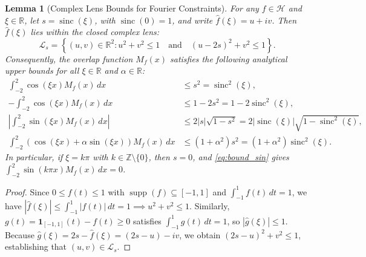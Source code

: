 \documentclass[11pt,a4paper]{article}
\newtheorem{lemma}[theorem]{Lemma}
\theoremstyle{definition}
\theoremstyle{remark}
\newcommand{\R}{\mathbb{R}}
\newcommand{\Z}{\mathbb{Z}}
\newcommand{\supp}{\operatorname{supp}}
\begin{document}
\begin{enumerate}
\begin{lemma}[Complex Lens Bounds for Fourier Constraints]
  \label{lem:lens}
  For any $f \in \mathcal{H}$ and $\xi \in \R$, let $s = \operatorname{sinc}(\xi)$, with $\operatorname{sinc}(0)=1$, and write $\widehat{f}(\xi) = u + iv$. Then $\widehat{f}(\xi)$ lies within the closed complex lens:
  \begin{equation}
  \mathcal{L}_s = \left\{ (u, v) \in \R^2 : u^2 + v^2 \le 1 \quad \text{and} \quad (u - 2s)^2 + v^2 \le 1 \right\}.
  \end{equation}
  Consequently, the overlap function $M_f(x)$ satisfies the following analytical upper bounds for all $\xi \in \R$ and $\alpha \in \R$:
  \begin{align}
  \int_{-2}^2 \cos(\xi x) M_f(x) \, dx &\le s^2 = \operatorname{sinc}^2(\xi), \label{eq:bound_cos} \\
  -\int_{-2}^2 \cos(\xi x) M_f(x) \, dx &\le 1 - 2s^2 = 1 - 2\operatorname{sinc}^2(\xi), \label{eq:bound_negcos} \\
  \left| \int_{-2}^2 \sin(\xi x) M_f(x) \, dx \right| &\le 2 |s| \sqrt{1 - s^2} = 2 |\operatorname{sinc}(\xi)| \sqrt{1 - \operatorname{sinc}^2(\xi)}, \label{eq:bound_sin} \\
  \int_{-2}^2 (\cos(\xi x) + \alpha \sin(\xi x)) M_f(x) \, dx &\le (1 + \alpha^2) s^2 = (1 + \alpha^2) \operatorname{sinc}^2(\xi). \label{eq:bound_linebundle}
  \end{align}
  In particular, if $\xi = k\pi$ with $k \in \Z \setminus \{0\}$, then $s = 0$, and \eqref{eq:bound_sin} gives $\int_{-2}^2 \sin(k\pi x) M_f(x) \, dx = 0$.
  \end{lemma}
  \begin{proof}
  Since $0 \le f(t) \le 1$ with $\supp(f) \subseteq [-1, 1]$ and $\int_{-1}^1 f(t) \, dt = 1$, we have $|\widehat{f}(\xi)| \le \int_{-1}^1 |f(t)| \, dt = 1 \implies u^2 + v^2 \le 1$. Similarly, $g(t) = \mathbf{1}_{[-1, 1]}(t) - f(t) \ge 0$ satisfies $\int_{-1}^1 g(t) \, dt = 1$, so $|\widehat{g}(\xi)| \le 1$. Because $\widehat{g}(\xi) = 2s - \widehat{f}(\xi) = (2s - u) - iv$, we obtain $(2s - u)^2 + v^2 \le 1$, establishing that $(u, v) \in \mathcal{L}_s$.
  

\end{proof}
\end{enumerate}
\end{document}
